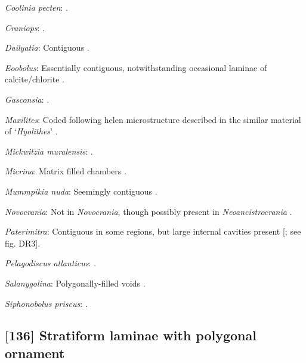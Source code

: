 \documentclass[openany]{book}
\begin{document}
\hypertarget{Coolinia_pecten-coding-135}{}
\emph{Coolinia pecten}: \citet{Dewing2004}.

\hypertarget{Craniops-coding-135}{}
\emph{Craniops}: \citep[fig. 249.1]{Williams1997Introduction}.

\hypertarget{Dailyatia-coding-135}{}
\emph{Dailyatia}: Contiguous \citep[figs. 54--55]{Skovsted2015Theearly}.

\hypertarget{Eoobolus-coding-135}{}
\emph{Eoobolus}: Essentially contiguous, notwithstanding occasional
laminae of calcite/chlorite \citep{Balthasar2007Anearly}.

\hypertarget{Gasconsia-coding-135}{}
\emph{Gasconsia}: \citet{Hanken1985Thetaxonomy}.

\hypertarget{Maxilites-coding-135}{}
\emph{Maxilites}: Coded following helen microstructure described in the
similar material of `\emph{Hyolithes}' \citep{MartiMus2007}.

\hypertarget{Mickwitzia_muralensis-coding-135}{}
\emph{Mickwitzia muralensis}: \citep{Balthasar2004Shellstructure}.

\hypertarget{Micrina-coding-135}{}
\emph{Micrina}: Matrix filled chambers \citep[fig.
DR1]{Balthasar2009Homologousskeletal}.

\hypertarget{Mummpikia_nuda-coding-135}{}
\emph{Mummpikia nuda}: Seemingly contiguous
\citep{Balthasar2008iMummpikia}.

\hypertarget{Novocrania-coding-135}{}
\emph{Novocrania}: Not in \emph{Novocrania}, though possibly present in
\emph{Neoancistrocrania} \citep{Parkinson2005}.

\hypertarget{Paterimitra-coding-135}{}
\emph{Paterimitra}: Contiguous in some regions, but large internal
cavities present {[}\citet{Balthasar2009Homologousskeletal}; see fig.
DR3{]}.

\hypertarget{Pelagodiscus_atlanticus-coding-135}{}
\emph{Pelagodiscus atlanticus}: \citet{Williams1998Chemicostructural}.

\hypertarget{Salanygolina-coding-135}{}
\emph{Salanygolina}: Polygonally-filled voids
\citep{Holmer2009Theenigmatic}.

\hypertarget{Siphonobolus_priscus-coding-135}{}
\emph{Siphonobolus priscus}: \citep{Williams2004Chemicostructure}.

\subsection*{{[}136{]} Stratiform laminae with polygonal
ornament}\label{stratiform-laminae-with-polygonal-ornament}
\end{document}
